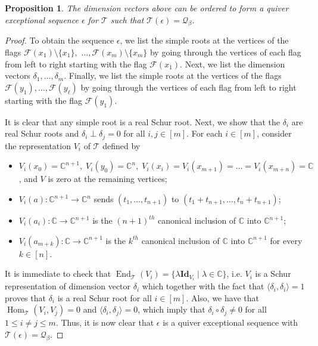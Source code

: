 \documentclass[11pt]{article}
\newtheorem{prop}[theo]{Proposition}
\theoremstyle{definition}
\numberwithin{equation}{section}
\newcommand{\Hom}{\operatorname{Hom}}
\newcommand{\End}{\operatorname{End}}
\newcommand{\CC}{\mathbb C}
\newcommand{\Q}{\mathbf{\mathcal{Q}}}
\newcommand{\Id}{\mathbf{Id}}
\newcommand{\F}{\mathcal{F}}
\newcommand{\E}{\epsilon}
\newcommand{\river}{\mathcal{T}}
\begin{document}
\begin{prop} \label{prop-embed-qes} The dimension vectors above can be ordered to form a quiver exceptional sequence $\E$ for $\river$ such that $\river(\E) = \Q_{\beta}$.
\end{prop} 
\begin{proof} To obtain the sequence $\E$, we list the simple roots at the vertices of the flags $\F(x_1)\setminus \{x_1\},$ $\ldots,\F(x_m) \setminus \{x_m\}$ by going through the vertices of each flag from left to right starting with the flag $\F(x_1)$. Next, we list the dimension vectors $\delta_1, \ldots, \delta_m$. Finally,  we list the simple roots at the vertices of the flags $\F(y_1), \ldots, \F(y_\ell)$ by going through the vertices of each flag from left to right starting with the flag $\F(y_1)$. 

It is clear that any simple root is a real Schur root. Next, we show that the $\delta_i$ are real Schur roots and $\delta_i \perp \delta_j=0$ for all $i,j \in [m]$. For each $i \in [m]$,  consider the representation $V_i$ of $\river$ defined by 
\begin{itemize}
\item $V_i(x_0) = \CC^{n+1}, \; V_i(y_0) = \CC^n, \; V_i(x_i) =V_i(x_{m+1})= \ldots = V_i(x_{m+n}) = \CC$, and $V$ is zero at the remaining vertices;
\item $V_i(a): \CC^{n+1} \to \CC^n$ sends $(t_1,\ldots, t_{n+1})$ to $(t_1+t_{n+1},\ldots, t_n+t_{n+1})$;
\item $V_i(a_i): \CC \to \CC^{n+1}$ is the $(n+1)^{th}$ canonical inclusion of $\CC$ into $\CC^{n+1}$;
\item $V_i(a_{m+k}):\CC \to \CC^{n+1}$ is the $k^{th}$ canonical inclusion of $\CC$ into $\CC^{n+1}$ for every $k \in [n]$.
\end{itemize}

It is immediate to check that $\End_{\river}(V_i) = \{\lambda \Id_{V_i} \mid \lambda \in \CC\}$, i.e. $V_i$ is a Schur representation of dimension vector $\delta_i$ which together with the fact that $\langle \delta_i, \delta_i \rangle =1$ proves that $\delta_i$ is a real Schur root for all $i \in [m]$. Also, we have that $\Hom_{\river}(V_i,V_j) = 0$ and $\langle \delta_i, \delta_j \rangle = 0$, which imply that $\delta_i \circ \delta_j\neq 0$ for all $1 \leq i \neq j \leq m$. Thus, it is now clear that $\E$ is a quiver exceptional sequence with $\river(\E) = \Q_\beta$.
\end{proof} 
\end{document}
